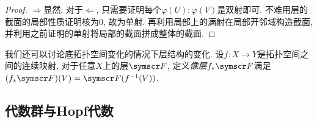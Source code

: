 \begin{proof}
  $\Rightarrow$显然. 对于$\Leftarrow$, 只需要证明每个$\varphi (U)\colon \varphi (V)$是双射即可. 不难用层的截面的局部性质证明核为0, 故为单射. 再利用局部上的满射在局部开邻域构造截面, 并利用之前证明的单射将局部的截面拼成整体的截面.
\end{proof}

我们还可以讨论底拓扑空间变化的情况下层结构的变化. 设$f\colon X\to Y$是拓扑空间之间的连续映射, 对于任意$X$上的层$\sheaf{F}$, 定义\emph{像层}$f_*\sheaf{F}$满足$(f_*\sheaf{F})(V)=\sheaf{F}(f^{-1}(V))$.

\bigskip


\subsection{代数群与Hopf代数}

